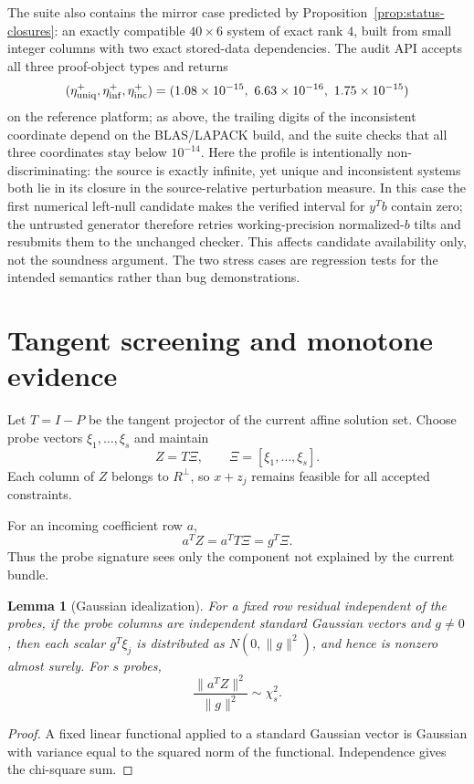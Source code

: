 \documentclass[11pt]{article}
\newtheorem{lemma}[theorem]{Lemma}
\theoremstyle{definition}
\newcommand{\orth}{\perp}
\begin{document}
The suite also contains the mirror case predicted by Proposition~\ref{prop:status-closures}: an exactly compatible $40\times6$ system of exact rank $4$, built from small integer columns with two exact stored-data dependencies. The audit API accepts all three proof-object types and returns
\[
(\eta_{\rm uniq}^+,\eta_{\rm inf}^+,\eta_{\rm inc}^+)
=(1.08\times10^{-15},\ 6.63\times10^{-16},\ 1.75\times10^{-15})
\]
on the reference platform; as above, the trailing digits of the inconsistent coordinate depend on the BLAS/LAPACK build, and the suite checks that all three coordinates stay below $10^{-14}$. Here the profile is intentionally non-discriminating: the source is exactly infinite, yet unique and inconsistent systems both lie in its closure in the source-relative perturbation measure. In this case the first numerical left-null candidate makes the verified interval for $y^Tb$ contain zero; the untrusted generator therefore retries working-precision normalized-$b$ tilts and resubmits them to the unchanged checker. This affects candidate availability only, not the soundness argument. The two stress cases are regression tests for the intended semantics rather than bug demonstrations.

\section{Tangent screening and monotone evidence}\label{sec:secant}
Let \(T=I-P\) be the tangent projector of the current affine solution set. Choose probe vectors \(\xi_1,\ldots,\xi_s\) and maintain
\[
Z=T\Xi,
\qquad
\Xi=[\xi_1,\ldots,\xi_s].
\]
Each column of \(Z\) belongs to \(R^\orth\), so \(x+z_j\) remains feasible for all accepted constraints.

For an incoming coefficient row \(a\),
\[
a^TZ=a^TT\Xi=g^T\Xi.
\]
Thus the probe signature sees only the component not explained by the current bundle.

\begin{lemma}[Gaussian idealization]
For a fixed row residual independent of the probes, if the probe columns are independent standard Gaussian vectors and \(g\neq0\), then each scalar \(g^T\xi_j\) is distributed as \(N(0,\|g\|^2)\), and hence is nonzero almost surely. For \(s\) probes,
\[
\frac{\|a^TZ\|^2}{\|g\|^2}\sim\chi_s^2.
\]
\end{lemma}

\begin{proof}
A fixed linear functional applied to a standard Gaussian vector is Gaussian with variance equal to the squared norm of the functional. Independence gives the chi-square sum.
\end{proof}
\end{document}
